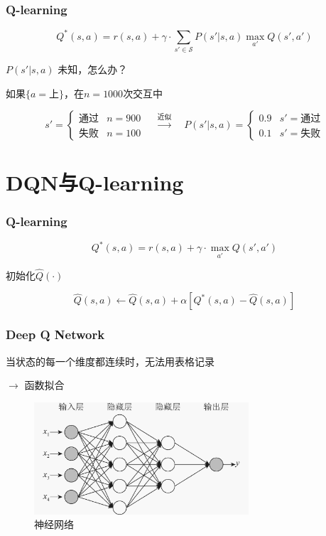 \documentclass[9pt]{beamer}
\begin{document}
\begin{frame}
\frametitle{Q-learning}

\[
Q^*(s,a)=r(s,a)+\gamma\cdot \sum_{s'\in \mathcal{S}}P(s'|s,a)\max_{a'}Q(s',a')
\]

\vspace{1em}


$P(s'|s,a)$ 未知，怎么办？\pause

\vspace{1em}


如果$\{a=\text{上}\}$，在$n=1000$次交互中

\[
s'=\begin{cases}
\text{通过} & n=900\\
\text{失败} & n=100
\end{cases}
\quad 
\xrightarrow{\text{近似}} 
\quad 
P(s'|s,a)= \begin{cases}
0.9 & s'=\text{通过}\\
0.1 & s'=\text{失败}
\end{cases}
\]

\end{frame}

\section{DQN与Q-learning}
\begin{frame}
\frametitle{Q-learning}

\[
Q^*(s,a)=r(s,a)+\gamma\cdot \max_{a'}Q(s',a')
\]

初始化$\hat{Q}(\cdot)$

\[
\hat{Q}(s,a)\leftarrow \hat{Q}(s,a)+\alpha \left [ Q^*(s,a)-\hat{Q}(s,a) \right]
\]

\vspace{1em}

\end{frame}

\begin{frame}
\frametitle{Deep Q Network}

当状态的每一个维度都连续时，无法用表格记录

\vspace{1em}

$\rightarrow$ 函数拟合

\begin{figure}
\centering
\includegraphics[width=8cm]{../fig/nn.jpg}
\caption{神经网络}
\end{figure}

\end{frame}
\end{document}
